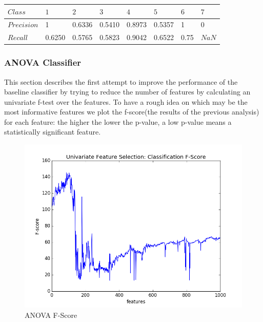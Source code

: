 \documentclass[a4paper,10pt]{article}
\begin{document}
      \begin{table}[H]
      	\centering
	\begin{tabular}{l|P{1cm}P{1cm}P{1cm}P{1cm}P{1cm}P{1cm}P{1cm}} \toprule
	  {$Class$} & {$1$} & {$2$} & {$3$} & {$4$} & {$5$} & {$6$} & {$7$} \\ \midrule
	  $Precision$  & 1 & 0.6336 & 0.5410 & 0.8973 & 0.5357 & 1 & 0 \\ \midrule
	  $Recall$  & 0.6250 & 0.5765 & 0.5823 & 0.9042 & 0.6522 & 0.75  & $NaN$  \\ \bottomrule
	\end{tabular}
      \end{table}
    
    \subsubsection{ANOVA Classifier}
      This section describes the first attempt to improve the performance of the baseline classifier by trying to reduce the number of
      features by calculating an univariate f-test over the features.\newline
      To have a rough idea on which may be the most informative features we plot the f-score(the results of the previous analysis) for each 
      feature: the higher the lower the p-value, a low p-value means a statistically significant feature.
      \begin{figure}[H]
	\centering
	\includegraphics[scale=0.5]{anova_f_score.png}
	\caption{ANOVA F-Score}
      \end{figure}
      
\end{document}
